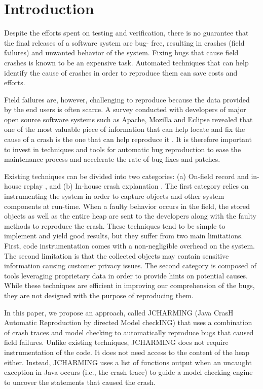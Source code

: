 \documentclass[times]{smrauth}
\begin{document}

\section{Introduction}

Despite the efforts spent on testing and verification, there is no
guarantee that the final releases of a software system are bug-
free, resulting in crashes (field failures) and unwanted
behavior of the system. Fixing bugs that cause field crashes is
known to be an expensive task. Automated techniques that can
help identify the cause of crashes in order to reproduce them
can save costs and efforts.

Field failures are, however, challenging to reproduce because
the data provided by the end users is often scarce. A survey
conducted with developers of major open source software
systems such as Apache, Mozilla and Eclipse revealed that
one of the most valuable piece of information that can help
locate and fix the cause of a crash is the one that can help
reproduce it \cite{Bettenburg2008}. It is therefore important to invest in
techniques and tools for automatic bug reproduction to ease
the maintenance process and accelerate the rate of bug fixes
and patches.

Existing techniques can be divided into two categories: (a)
On-field record and in-house replay \cite{Narayanasamy2005,Artzi2008,Jaygarl}, and (b) In-house crash explanation \cite{Manevich2004,chandra2009snugglebug}. The first category relies on
instrumenting the system in order to capture objects and other
system components at run-time. When a faulty behavior
occurs in the field, the stored objects as well as the entire heap
are sent to the developers along with the faulty methods to
reproduce the crash. These techniques tend to be simple to
implement and yield good results, but they suffer from two
main limitations. First, code instrumentation comes with a
non-negligible overhead on the system. The second limitation
is that the collected objects may contain sensitive information
causing customer privacy issues. The second category is
composed of tools leveraging proprietary data in order to
provide hints on potential causes. While these techniques are
efficient in improving our comprehension of the bugs, they are
not designed with the purpose of reproducing them.

In this paper, we propose an approach, called JCHARMING
(Java CrasH Automatic Reproduction by directed Model
checkING) that uses a combination of crash traces and model
checking to automatically reproduce bugs that caused field
failures. Unlike existing techniques, JCHARMING does not
require instrumentation of the code. It does not need access to
the content of the heap either. Instead, JCHARMING uses a
list of functions output when an uncaught exception in Java
occurs (i.e., the crash trace) to guide a model checking engine
to uncover the statements that caused the crash.
\end{document}
